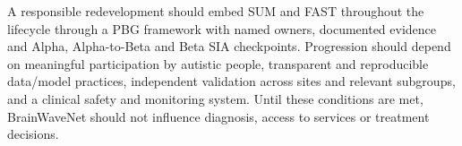 \documentclass[11pt,a4paper]{article}
\begin{document}
A responsible redevelopment should embed SUM and FAST throughout the lifecycle through a PBG framework with named owners, documented evidence and Alpha, Alpha-to-Beta and Beta SIA checkpoints. Progression should depend on meaningful participation by autistic people, transparent and reproducible data/model practices, independent validation across sites and relevant subgroups, and a clinical safety and monitoring system. Until these conditions are met, BrainWaveNet should not influence diagnosis, access to services or treatment decisions.

\printbibliography[heading=bibintoc,title={References}]
\end{document}
